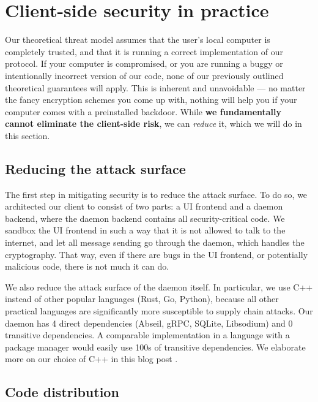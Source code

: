 \section{Client-side security in practice}

Our theoretical threat model assumes that the user's local computer is completely trusted, and that it is running a correct implementation of our protocol. If your computer is compromised, or you are running a buggy or intentionally incorrect version of our code, none of our previously outlined theoretical guarantees will apply. This is inherent and unavoidable — no matter the fancy encryption schemes you come up with, nothing will help you if your computer comes with a preinstalled backdoor. While \textbf{we fundamentally cannot eliminate the client-side risk}, we can \textit{reduce} it, which we will do in this section.

\subsection{Reducing the attack surface}

The first step in mitigating security is to reduce the attack surface. To do so, we architected our client to consist of two parts: a UI frontend and a daemon backend, where the daemon backend contains all security-critical code. We sandbox the UI frontend in such a way that it is not allowed to talk to the internet, and let all message sending go through the daemon, which handles the cryptography. That way, even if there are bugs in the UI frontend, or potentially malicious code, there is not much it can do.


We also reduce the attack surface of the daemon itself. In particular, we use C++ instead of other popular languages (Rust, Go, Python), because all other practical languages are significantly more susceptible to supply chain attacks. Our daemon has 4 direct dependencies (Abseil, gRPC, SQLite, Libsodium) and 0 transitive dependencies. A comparable implementation in a language with a package manager would easily use 100s of transitive dependencies. We elaborate more on our choice of C++ in this blog post .

\subsection{Code distribution}

